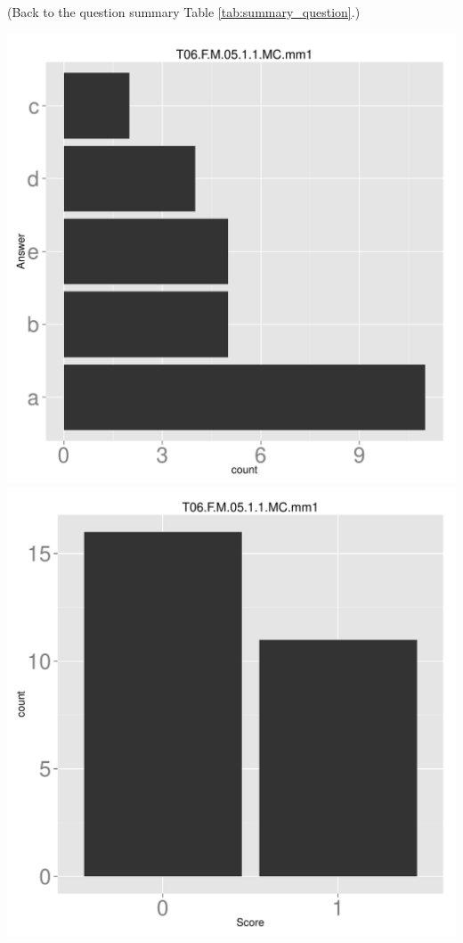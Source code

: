 \documentclass[12pt,nohyper]{tufte-handout}\usepackage[]{graphicx}\usepackage[]{color}
\begin{document}
 (Back to the question summary Table \ref{tab:summary_question}.)

\begin{center} \includegraphics[width=.45\linewidth]{Topic06_45_answer} \includegraphics[width=.45\linewidth]{Topic06_45_score} \end{center} 
\end{document}
